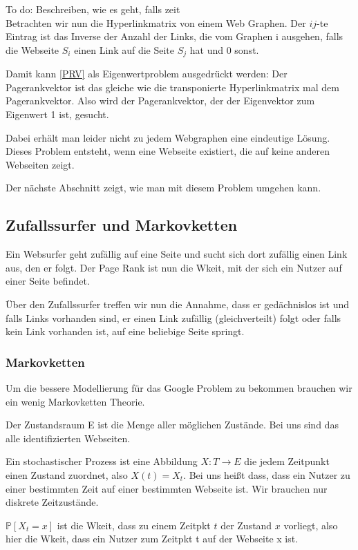 \documentclass[]{article}
\begin{document}
To do: Beschreiben, wie es geht, falls zeit \\

Betrachten wir nun die Hyperlinkmatrix von einem Web Graphen. Der $ij$-te Eintrag ist das Inverse der Anzahl der Links, die vom Graphen i ausgehen, falls die Webseite $S_i$ einen Link auf die Seite $S_j$ hat und 0 sonst. 

Damit kann \eqref{PRV} als Eigenwertproblem ausgedrückt werden: Der Pagerankvektor ist das gleiche wie die transponierte Hyperlinkmatrix mal dem Pagerankvektor. Also wird der Pagerankvektor, der der Eigenvektor zum Eigenwert 1 ist, gesucht. 

Dabei erhält man leider nicht zu jedem Webgraphen eine eindeutige Lösung. Dieses Problem entsteht, wenn eine Webseite existiert, die auf keine anderen Webseiten zeigt. 

Der nächste Abschnitt zeigt, wie man mit diesem Problem umgehen kann. 

\subsection{Zufallssurfer und Markovketten}

Ein Websurfer geht zufällig auf eine Seite und sucht sich dort zufällig einen Link aus, den er folgt. Der Page Rank ist nun die Wkeit, mit der sich ein Nutzer auf einer Seite befindet. 

Über den Zufallssurfer treffen wir nun die Annahme, dass er gedächnislos ist und falls Links vorhanden sind, er einen Link zufällig (gleichverteilt) folgt oder falls kein Link vorhanden ist, auf eine beliebige Seite springt. 

\subsubsection{Markovketten}
Um die bessere Modellierung für das Google Problem zu bekommen brauchen wir ein wenig Markovketten Theorie. 

Der Zustandsraum E ist die Menge aller möglichen Zustände. Bei uns sind das alle identifizierten Webseiten.

 Ein stochastischer Prozess ist eine Abbildung $X:T \rightarrow E$ die jedem Zeitpunkt einen Zustand zuordnet, also $X(t)=X_t$. Bei uns heißt dass, dass ein Nutzer zu einer bestimmten Zeit auf einer bestimmten Webseite ist.  Wir brauchen nur diskrete Zeitzustände. 
 
 $\mathbb{P}[X_t=x]$ ist die Wkeit, dass zu einem Zeitpkt $t$ der Zustand $x$ vorliegt, also hier die Wkeit, dass ein Nutzer zum Zeitpkt t auf der Webseite x ist. 
 
\end{document}

